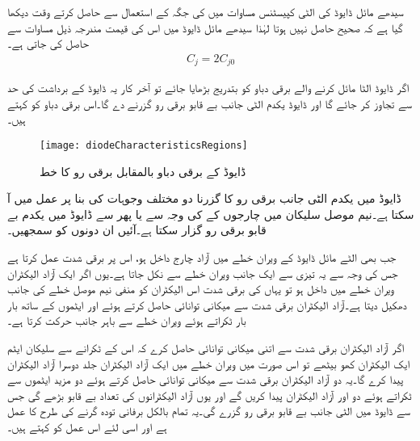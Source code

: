 سیدھے مائل ڈایوڈ کی الٹی کپیسٹنس   مساوات   میں کی جگہ  کے استعمال سے حاصل کرتے وقت دیکھا گیا ہے کہ صحیح حاصل نہیں ہوتا لہٰذا سیدھے مائل ڈایوڈ میں اس کی قیمت مندرجہ ذیل مساوات سے حاصل کی جاتی ہے۔
\begin{align}
C_j = 2 C_{j0}
\end{align}

\label{حصہ_بے_قابو_صورت}
اگر ڈایوڈ الٹا مائل کرنے والے برقی دباو کو بتدریج بڑھایا جائے تو آخر کار یہ ڈایوڈ کے برداشت کی حد سے تجاوز کر جائے گا اور ڈایوڈ یکدم الٹی جانب بے قابو برقی رو گزرنے دے گا۔اس برقی دباو کو      کہتے ہیں۔
\begin{figure}
\centering
\texttt{[image: diodeCharacteristicsRegions]}
\caption{ڈایوڈ کے برقی دباو بالمقابل برقی رو کا خط}
\label{شکل_بے_قابو_ڈایوڈ}
\end{figure}
ڈایوڈ میں یکدم الٹی جانب برقی رو کا گزرنا دو مختلف وجوہات کی بنا پر عمل میں آ سکتا ہے۔نیم موصل سلیکان میں چارجوں کے  کی وجہ سے یا پھر   سے  ڈایوڈ میں یکدم بے قابو برقی رو گزار سکتا ہے۔آئیں ان دونوں کو سمجھیں۔

جب بھی الٹے مائل ڈایوڈ کے ویران خطے میں آزاد چارج داخل ہو، اس پر برقی شدت  عمل کرتا ہے جس کی وجہ سے یہ تیزی سے ایک جانب ویران خطے سے نکل جاتا ہے۔یوں اگر ایک آزاد الیکٹران ویران خطے میں داخل ہو تو یہاں کی برقی شدت  اس الیکٹران کو منفی نیم موصل خطے کی جانب دھکیل دیتا ہے۔آزاد الیکٹران برقی شدت سے میکانی توانائی حاصل کرتے ہوئے اور ایٹموں کے ساتھ بار بار ٹکراتے ہوئے ویران خطے سے باہر جانب حرکت کرتا ہے۔

اگر آزاد الیکٹران برقی شدت سے اتنی میکانی توانائی حاصل کرے کہ اس کے ٹکرانے سے سلیکان ایٹم ایک الیکٹران کھو بیٹھے تو اس صورت میں ویران خطے میں ایک آزاد الیکٹران جلد دوسرا آزاد الیکٹران پیدا کرے گا۔یہ دو آزاد الیکٹران برقی شدت سے میکانی توانائی حاصل کرتے ہوئے دو مزید ایٹموں سے ٹکراتے ہوئے دو اور آزاد الیکٹران پیدا کریں گے اور یوں آزاد الیکٹرانوں کی تعداد بے قابو بڑھے گی جس سے ڈایوڈ میں الٹی جانب بے قابو برقی رو گزرے گی۔یہ تمام بالکل برفانی تودہ گرنے کی طرح کا عمل ہے اور اسی لئے اس عمل کو  کہتے ہیں۔

